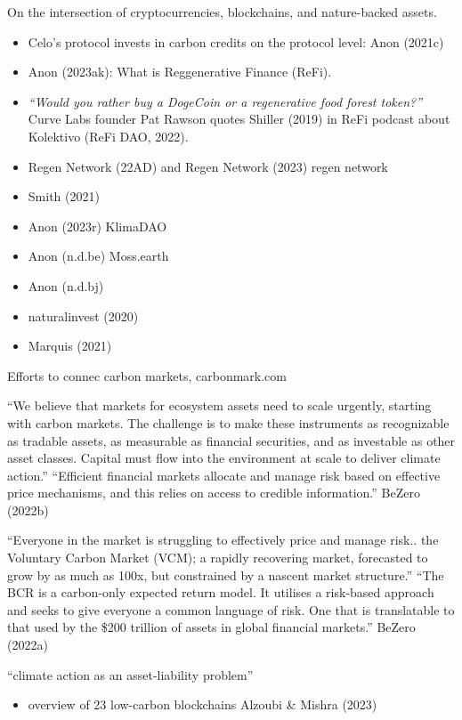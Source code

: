 \documentclass[
  letterpaper,
  DIV=11,
  numbers=noendperiod]{scrartcl}
\providecommand{\tightlist}{%
  \setlength{\itemsep}{0pt}\setlength{\parskip}{0pt}}\usepackage{longtable,booktabs,array}
\begin{document}
On the intersection of cryptocurrencies, blockchains, and nature-backed
assets.

\begin{itemize}
\tightlist
\item
  Celo's protocol invests in carbon credits on the protocol level: Anon
  (2021c)
\item
  Anon (2023ak): What is Reggenerative Finance (ReFi).
\item
  \emph{``Would you rather buy a DogeCoin or a regenerative food forest
  token?''} Curve Labs founder Pat Rawson quotes Shiller (2019) in ReFi
  podcast about Kolektivo (ReFi DAO, 2022).
\item
  Regen Network (22AD) and Regen Network (2023) regen network
\item
  Smith (2021)
\item
  Anon (2023r) KlimaDAO
\item
  Anon (n.d.be) Moss.earth
\item
  Anon (n.d.bj)
\item
  naturalinvest (2020)
\item
  Marquis (2021)
\end{itemize}

Efforts to connec carbon markets, carbonmark.com

``We believe that markets for ecosystem assets need to scale urgently,
starting with carbon markets. The challenge is to make these instruments
as recognizable as tradable assets, as measurable as financial
securities, and as investable as other asset classes. Capital must flow
into the environment at scale to deliver climate action.'' ``Efficient
financial markets allocate and manage risk based on effective price
mechanisms, and this relies on access to credible information.'' BeZero
(2022b)

``Everyone in the market is struggling to effectively price and manage
risk.. the Voluntary Carbon Market (VCM); a rapidly recovering market,
forecasted to grow by as much as 100x, but constrained by a nascent
market structure.'' ``The BCR is a carbon-only expected return model. It
utilises a risk-based approach and seeks to give everyone a common
language of risk. One that is translatable to that used by the \$200
trillion of assets in global financial markets.'' BeZero (2022a)

``climate action as an asset-liability problem''

\begin{itemize}
\tightlist
\item
  overview of 23 low-carbon blockchains Alzoubi \& Mishra (2023)
\end{itemize}
\end{document}
